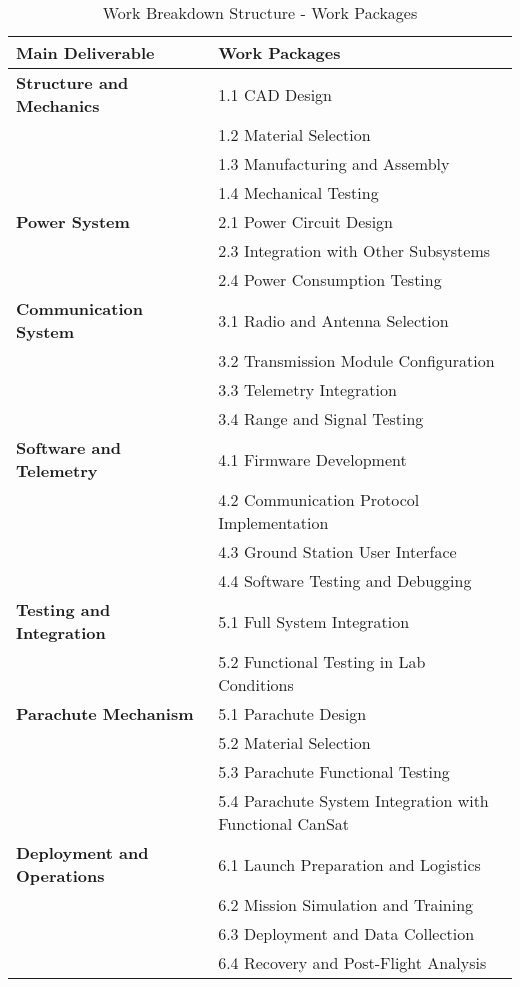 \documentclass{article}
\begin{document}
\begin{table}[h!]
    \centering
    \begin{tabular}{ll}
        \toprule
        \textbf{Main Deliverable} & \textbf{Work Packages} \\
        \midrule
        \textbf{Structure and Mechanics} & 1.1 CAD Design \\
        & 1.2 Material Selection \\
        & 1.3 Manufacturing and Assembly \\
        & 1.4 Mechanical Testing \\
        \midrule
        \textbf{Power System} & 2.1 Power Circuit Design \\
        & 2.3 Integration with Other Subsystems \\
        & 2.4 Power Consumption Testing \\
        \midrule
        \textbf{Communication System} & 3.1 Radio and Antenna Selection \\
        & 3.2 Transmission Module Configuration \\
        & 3.3 Telemetry Integration \\
        & 3.4 Range and Signal Testing \\
        \midrule
        \textbf{Software and Telemetry} & 4.1 Firmware Development \\
        & 4.2 Communication Protocol Implementation \\
        & 4.3 Ground Station User Interface \\
        & 4.4 Software Testing and Debugging \\
        \midrule
        \textbf{Testing and Integration} & 5.1 Full System Integration \\
        & 5.2 Functional Testing in Lab Conditions \\
        \midrule
        \textbf{Parachute Mechanism} & 5.1 Parachute Design \\
        & 5.2 Material Selection \\
        & 5.3 Parachute Functional Testing \\
        & 5.4 Parachute System Integration with Functional CanSat\\
        \midrule
        \textbf{Deployment and Operations} & 6.1 Launch Preparation and Logistics \\
        & 6.2 Mission Simulation and Training \\
        & 6.3 Deployment and Data Collection \\
        & 6.4 Recovery and Post-Flight Analysis \\
        \bottomrule
    \end{tabular}
    \caption{Work Breakdown Structure - Work Packages}
    \label{tab:wbs_workpackages}
\end{table}
\end{document}
